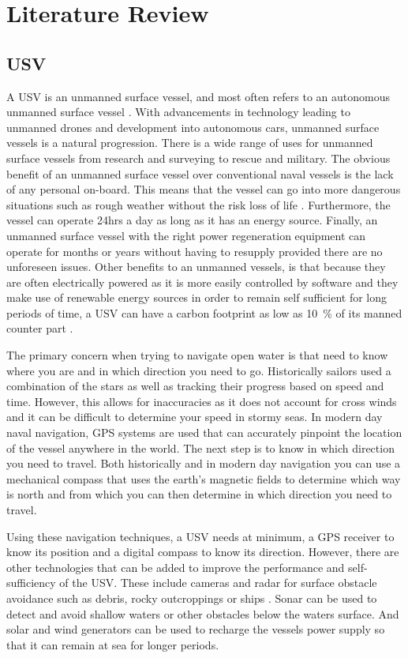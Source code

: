 \chapter{Literature Review}
\section{USV}
A USV is an unmanned surface vessel, and most often refers to an autonomous unmanned surface vessel \cite{Patterson2022}. With advancements in technology leading to unmanned drones and development into autonomous cars, unmanned surface vessels is a natural progression. There is a wide range of uses for unmanned surface vessels from research and surveying to rescue and military. The obvious benefit of an unmanned surface vessel over conventional naval vessels is the lack of any personal on-board. This means that the vessel can go into more dangerous situations such as rough weather without the risk loss of life \cite{Oceanalpha}. Furthermore, the vessel can operate 24hrs a day as long as it has an energy source. Finally, an unmanned surface vessel with the right power regeneration equipment can operate for months or years without having to resupply provided there are no unforeseen issues. Other benefits to an unmanned vessels, is that because they are often electrically powered as it is more easily controlled by software and they make use of renewable energy sources in order to remain self sufficient for long periods of time, a USV can have a carbon footprint as low as \SI{10}{\percent} of its manned counter part \cite{Fugro}.\par
The primary concern when trying to navigate open water is that need to know where you are and in which direction you need to go. Historically sailors used a combination of the stars as well as tracking their progress based on speed and time. However, this allows for inaccuracies as it does not account for cross winds and it can be difficult to determine your speed in stormy seas. In modern day naval navigation, GPS systems are used that can accurately pinpoint the location of the vessel anywhere in the world. The next step is to know in which direction you need to travel. Both historically and in modern day navigation you can use a mechanical compass that uses the earth's magnetic fields to determine which way is north and from which you can then determine in which direction you need to travel. \par
Using these navigation techniques, a USV needs at minimum, a GPS receiver to know its position and a digital compass to know its direction. However, there are other technologies that can be added to improve the performance and self-sufficiency of the USV. These include cameras and radar for surface obstacle avoidance such as debris, rocky outcroppings or ships \cite{Oceanalpha}. Sonar can be used to detect and avoid shallow waters or other obstacles below the waters surface. And solar and wind generators can be used to recharge the vessels power supply so that it can remain at sea for longer periods. 
